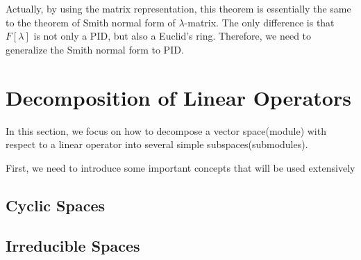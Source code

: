 Actually, by using the matrix representation, this theorem is essentially the same to the theorem of Smith normal form of $\lambda$-matrix. The only difference is that $F[\lambda]$ is not only a PID, but also a Euclid's ring. Therefore, we need to generalize the Smith normal form to PID.
\begin{theorem}

\end{theorem}





\section{Decomposition of Linear Operators}
In this section, we focus on how to decompose a vector space(module) with respect to a linear operator into several simple subspaces(submodules).
\par First, we need to introduce some important concepts that will be used extensively



\subsection{Cyclic Spaces}


\subsection{Irreducible Spaces}


